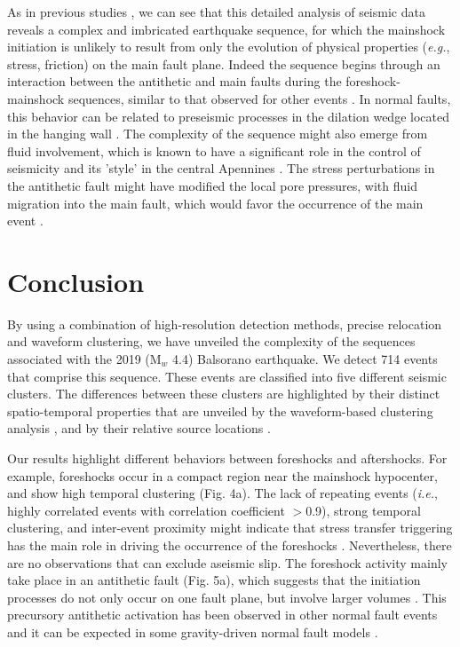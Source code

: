 \documentclass[a4paper,12pt,twoside]{article}
\begin{document}
As in previous studies \citep{Mcmahon_2017_STE, Savage_2017_PPS, Mcmahon2019_STA}, we can see that this detailed analysis of seismic data reveals a complex and imbricated earthquake sequence, for which the mainshock initiation is unlikely to result from only the evolution of physical properties (\emph{e.g.}, stress, friction) on the main fault plane. Indeed the sequence begins through an interaction between the antithetic and main faults during the foreshock-mainshock sequences, similar to that observed for other events \citep{Chiaraluce_2011_AAN, Mcmahon2019_STA}. In normal faults, this behavior can be related to preseismic processes in the dilation wedge located in the hanging wall \citep{Doglion_2011_RBD}. The complexity of the sequence might also emerge from fluid involvement, which is known to have a significant role in the control of seismicity and its 'style' in the central Apennines \citep{antonioli2005fluid, poliseasonal}. The stress perturbations in the antithetic fault might have modified the local pore pressures, with fluid migration into the main fault, which would favor the occurrence of the main event \citep{Doglion_2011_RBD}. 

\section*{Conclusion}

By using a combination of high-resolution detection methods, precise relocation \citep[\emph{e.g.},][]{Gibbons_2006_DLM, Waldhauser_2001_HDD} and waveform clustering, we have unveiled the complexity of the sequences associated with the 2019 (M$_w$ 4.4) Balsorano earthquake. We detect 714 events that comprise this sequence. These events are classified into five different seismic clusters. The differences between these clusters are highlighted by their distinct spatio-temporal properties that are unveiled by the waveform-based clustering analysis \citep{Kagan_1991_LTE, wehling_2013_IDT, Cesca_2014_SMC, Ellsworth_2018_NIE}, and by their relative source locations \citep{Waldhauser_2001_HDD}.

Our results highlight different behaviors between foreshocks and aftershocks. For example, foreshocks occur in a compact region near the mainshock hypocenter, and show high temporal clustering  (Fig. 4a). The lack of repeating events (\emph{i.e.}, highly correlated events with correlation coefficient $>$0.9), strong temporal clustering, and inter-event proximity might indicate that stress transfer triggering has the main role in driving the occurrence of the foreshocks \citep{Dodge_1996_DOC}. Nevertheless, there are no observations that can exclude aseismic slip. The foreshock activity mainly take place in an antithetic fault (Fig. 5a), which suggests that the initiation processes do not only occur on one fault plane, but involve larger volumes \citep{Savage_2017_PPS}. This precursory antithetic activation has been observed in other normal fault events \citep{Chiaraluce_2011_AAN} and it can be expected in some gravity-driven normal fault models \citep{Doglion_2011_RBD}. 
\end{document}
